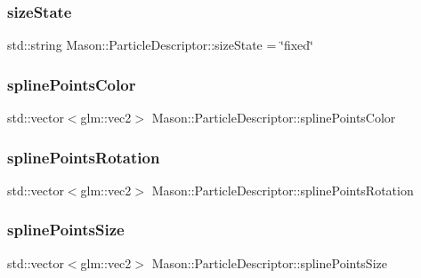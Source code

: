 \subsubsection{\texorpdfstring{size\+State}{sizeState}}
{\footnotesize\ttfamily std\+::string Mason\+::\+Particle\+Descriptor\+::size\+State = \char`\"{}fixed\char`\"{}}

\hypertarget{class_mason_1_1_particle_descriptor_a3a7588bd840bc8010f23bda75ec56e5d}{}\label{class_mason_1_1_particle_descriptor_a3a7588bd840bc8010f23bda75ec56e5d} 
\subsubsection{\texorpdfstring{spline\+Points\+Color}{splinePointsColor}}
{\footnotesize\ttfamily std\+::vector$<$glm\+::vec2$>$ Mason\+::\+Particle\+Descriptor\+::spline\+Points\+Color}

\hypertarget{class_mason_1_1_particle_descriptor_aad86105e768cb5cf59c26d1277ccad2e}{}\label{class_mason_1_1_particle_descriptor_aad86105e768cb5cf59c26d1277ccad2e} 
\subsubsection{\texorpdfstring{spline\+Points\+Rotation}{splinePointsRotation}}
{\footnotesize\ttfamily std\+::vector$<$glm\+::vec2$>$ Mason\+::\+Particle\+Descriptor\+::spline\+Points\+Rotation}

\hypertarget{class_mason_1_1_particle_descriptor_aefa11cd147ec20d3084c661245abb49c}{}\label{class_mason_1_1_particle_descriptor_aefa11cd147ec20d3084c661245abb49c} 
\subsubsection{\texorpdfstring{spline\+Points\+Size}{splinePointsSize}}
{\footnotesize\ttfamily std\+::vector$<$glm\+::vec2$>$ Mason\+::\+Particle\+Descriptor\+::spline\+Points\+Size}

